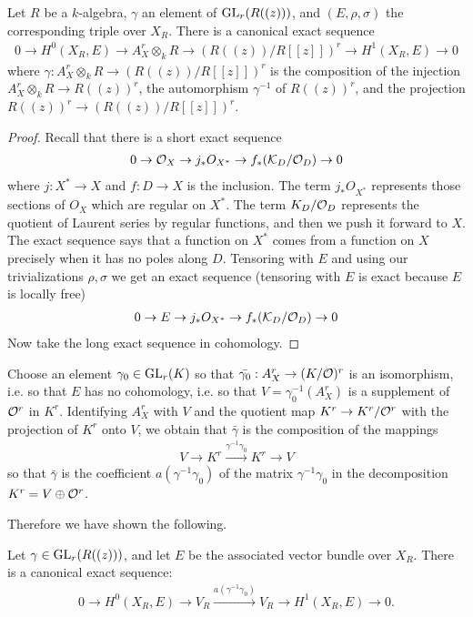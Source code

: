 \documentclass[12pt]{article}
\begin{document}
\begin{proposition}
    Let $R$ be a $k$-algebra, $\gamma$ an element of $\operatorname{GL}_r(R((z)))$, and $(E,\rho,\sigma)$ the corresponding triple over $X_R$. There is a canonical exact sequence \begin{align*}
        0 \to H^0(X_R,E) \to A_X^r \otimes_k R \to (R((z))/R[[z]])^r \to H^1(X_R,E) \to 0
    \end{align*} where $\gamma: A_X^r \otimes_k R \to (R((z))/R[[z]])^r$ is the composition of the injection $A_X^r \otimes_k R \to R((z))^r$, the automorphism $\gamma^{-1}$ of $R((z))^r$, and the projection $R((z))^r \to (R((z))/R[[z]])^r$.
\end{proposition}
\begin{proof}
    Recall that there is a short exact sequence \begin{align*}
        0 \to {\mathcal{O}}_X \to j_*O_{X^*} \to f_*({\mathcal{K}}_D/{\mathcal{O}}_D) \to 0
    \end{align*} where $j: X^* \to X$ and $f: D \to X$ is the inclusion. The term $j_*O_{X^*}$ represents those sections of $O_X$ which are regular on $X^*$. The term $K_D/{\mathcal{O}}_D$ represents the quotient of Laurent series by regular functions, and then we push it forward to $X$. The exact sequence says that a function on $X^*$ comes from a function on $X$ precisely when it has no poles along $D$. Tensoring with $E$ and using our trivializations $\rho,\sigma$ we get an exact sequence (tensoring with $E$ is exact because $E$ is locally free) \begin{align*}
        0 \to E \to j_*O_{X^*} \to f_*({\mathcal{K}}_D/{\mathcal{O}}_D) \to 0
    \end{align*} Now take the long exact sequence in cohomology.
\end{proof}
Choose an element $\gamma_0\in \operatorname{GL}_r(K)$ so that $\bar{\gamma_0}:A_X^r \to (K/{\mathcal{O}})^r$ is an isomorphism, i.e. so that $E$ has no cohomology, i.e. so that $V = \gamma_0^{-1}(A_X^r)$ is a supplement of ${\mathcal{O}}^r$ in $K^r$. Identifying $A_X^r$ with $V$ and the quotient map $K^r \to K^r/{\mathcal{O}}^r$ with the projection of $K^r$ onto $V$, we obtain that $\bar{\gamma}$ is the composition of the mappings \begin{align*}
    V \to K^r \xrightarrow{\gamma^{-1}\gamma_0} K^r \to V
\end{align*} so that $\bar{\gamma}$ is the coefficient $a(\gamma^{-1}\gamma_0)$ of the matrix $\gamma^{-1}\gamma_0$ in the decomposition $K^r = V \oplus {\mathcal{O}}^r$.

Therefore we have shown the following.
\begin{proposition}
    Let $\gamma \in \operatorname{GL}_r(R((z)))$, and let $E$ be the associated vector bundle over $X_R$. There is a canonical exact sequence:
    \begin{align*}
        0 \to H^0(X_R, E) \to V_R \xrightarrow{a(\gamma^{-1}\gamma_0)} V_R \to H^1(X_R, E) \to 0.
    \end{align*}
\end{proposition}
\end{document}
